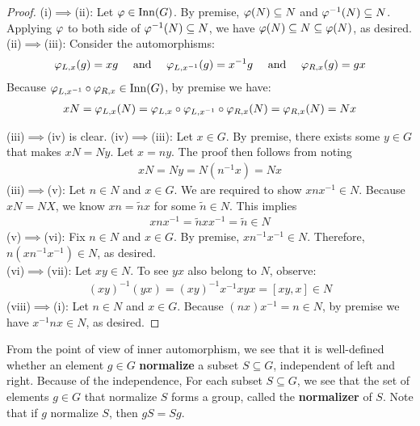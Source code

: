 \documentclass{report}
\begin{document}
\begin{proof}
  (i)$\implies $(ii): Let $\pfi  \in \operatorname{Inn}(G)$. By premise, $\pfi  (N)\subseteq N$ and $\pfi ^{-1}(N)\subseteq N$. Applying  $\pfi $ to both side of $\pfi ^{-1}(N)\subseteq N$, we have $\pfi (N)\subseteq N \subseteq \pfi  (N)$, as desired. \\

(ii)$\implies $(iii): Consider the automorphisms:  
\begin{align*}
 \pfi_{L,x}(g)= xg\quad \text{ and }\quad \pfi _{L,x^{-1}}(g)=x^{-1}g \quad \text{ and }\quad \pfi _{R,x}(g)= gx
\end{align*}
 Because $\pfi _{L,x^{-1}}\circ \pfi _{R,x} \in \operatorname{Inn}(G)$, by premise we have:
\begin{align*}
xN= \pfi _{L,x}(N)= \pfi _{L,x}\circ \pfi _{L,x^{-1}}\circ \pfi _{R,x}(N)= \pfi _{R,x}(N)=Nx 
\end{align*}

(iii)$\implies $(iv) is clear. (iv)$\implies $(iii): Let $x\in G$. By premise, there exists some $y\in G$ that makes $xN=Ny$. Let $x=ny$. The proof then follows from noting 
\begin{align*}
xN=Ny=N(n^{-1}x)=Nx
\end{align*}
(iii)$\implies $(v): Let $n \in N$ and $x \in G$. We are required to show $xnx^{-1} \in N$. Because $xN=NX$, we know  $xn=\tilde{n}x$ for some $\tilde{n}\in N$. This implies 
\begin{align*}
xnx^{-1}= \tilde{n}xx^{-1}=\tilde{n}\in N  
\end{align*}
(v)$\implies $(vi): Fix $n\in N$ and $x\in G$. By premise, $xn^{-1}x^{-1} \in N$. Therefore, $n(xn^{-1}x^{-1})\in N$, as desired.\\


(vi)$\implies $(vii): Let $xy \in N$. To see $yx$ also belong to $N$, observe: 
\begin{align*}
 (xy)^{-1}(yx) =(xy)^{-1}x^{-1}xyx=[xy,x] \in N
\end{align*}
(viii)$\implies $(i): Let $n \in N$ and $x\in G$. Because $(nx)x^{-1}=n \in N$, by premise we have $x^{-1}nx \in N$, as desired.
\end{proof}



From the point of view of inner automorphism, we see that it is well-defined whether an element $g\in G$ \textbf{normalize} a subset $S\subseteq G$, independent of left and right.  Because of the independence, For each subset $S\subseteq G$, we see that the set of elements $g\in G$ that normalize $S$ forms a group, called the \textbf{normalizer} of $S$. Note that if $g$ normalize  $S$, then $gS = Sg$.\\
\end{document}
